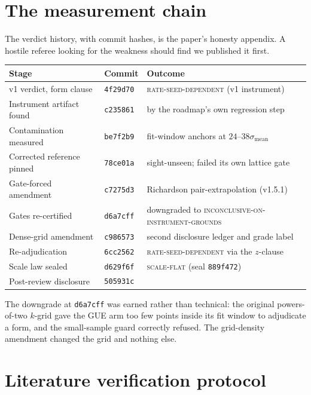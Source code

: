 \documentclass[11pt]{article}
\newcommand{\smean}{\sigma_{\mathrm{mean}}}
\newcommand{\verdict}[1]{\textsc{#1}}
\begin{document}
\appendix

\section{The measurement chain}
\label{app:chain}

The verdict history, with commit hashes, is the paper's honesty appendix. A hostile referee
looking for the weakness should find we published it first.

\begin{table}[h]
\centering
\small
\begin{tabular}{lll}
\toprule
Stage & Commit & Outcome \\
\midrule
v1 verdict, form clause & \texttt{4f29d70} & \verdict{rate-seed-dependent} (v1 instrument) \\
Instrument artifact found & \texttt{c235861} & by the roadmap's own regression step \\
Contamination measured & \texttt{be7f2b9} & fit-window anchors at $24$--$38\smean$ \\
Corrected reference pinned & \texttt{78ce01a} & sight-unseen; failed its own lattice gate \\
Gate-forced amendment & \texttt{c7275d3} & Richardson pair-extrapolation (v1.5.1) \\
Gates re-certified & \texttt{d6a7cff} & downgraded to \verdict{inconclusive-on-instrument-grounds} \\
Dense-grid amendment & \texttt{c986573} & second disclosure ledger and grade label \\
Re-adjudication & \texttt{6cc2562} & \verdict{rate-seed-dependent} via the $z$-clause \\
Scale law sealed & \texttt{d629f6f} & \verdict{scale-flat} (seal \texttt{889f472}) \\
Post-review disclosure & \texttt{505931c} & \\
\bottomrule
\end{tabular}
\end{table}

The downgrade at \texttt{d6a7cff} was earned rather than technical: the original powers-of-two
$k$-grid gave the GUE arm too few points inside its fit window to adjudicate a form, and the
small-sample guard correctly refused. The grid-density amendment changed the grid and nothing
else.

\section{Literature verification protocol}
\label{app:lit}
\end{document}
